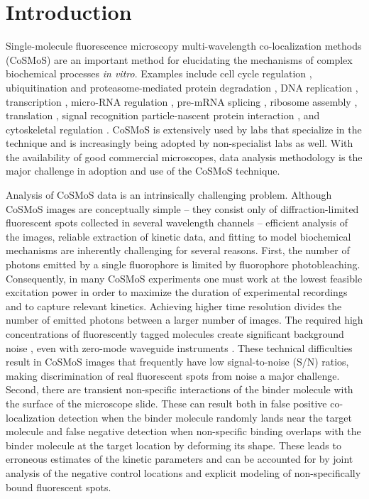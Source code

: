 \section{Introduction}

Single-molecule fluorescence microscopy multi-wavelength co-localization methods (CoSMoS) are an important method for elucidating the mechanisms of complex biochemical processes \textit{in vitro}. Examples include cell cycle regulation \citep{Lu2015-eu}, ubiquitination and proteasome-mediated protein degradation \citep{Lu2015-jq}, DNA replication \citep{Geertsema2014-bt,Ticau2015-ib}, transcription \citep{Zhang2012-no,Friedman2012-if,Friedman2013-sf}, micro-RNA regulation \citep{Salomon2015-kq}, pre-mRNA splicing \citep{Shcherbakova2013-bi, Krishnan2013-fy, Warnasooriya2014-ls}, ribosome assembly \citep{Kim2014-zc}, translation \citep{Wang2015-tt,Tsai2014-mi,OLeary2013-wo}, signal recognition particle-nascent protein interaction \citep{Noriega2014-vj}, and cytoskeletal regulation \citep{Smith2013-qj,Breitsprecher2012-mj}. CoSMoS is extensively used by labs that specialize in the technique and is increasingly being adopted by non-specialist labs as well. With the availability of good commercial microscopes, data analysis methodology is the major challenge in adoption and use of the CoSMoS technique.

Analysis of CoSMoS data is an intrinsically challenging problem. Although CoSMoS images are conceptually simple -- they consist only of diffraction-limited fluorescent spots collected in several wavelength channels -- efficient analysis of the images, reliable extraction of kinetic data, and fitting to model biochemical mechanisms are inherently challenging for several reasons. First, the number of photons emitted by a single fluorophore is limited by fluorophore photobleaching. Consequently, in many CoSMoS experiments one must work at the lowest feasible excitation power in order to maximize the duration of experimental recordings and to capture relevant kinetics. Achieving higher time resolution divides the number of emitted photons between a larger number of images. The required high concentrations of fluorescently tagged molecules create significant background noise \citep{Peng2018-ge, Van_Oijen2011-ig}, even with zero-mode waveguide instruments \citep{Chen2014-jd}. These technical difficulties result in CoSMoS images that frequently have low signal-to-noise (S/N) ratios, making discrimination of real fluorescent spots from noise a major challenge. Second, there are transient non-specific interactions of the binder molecule with the surface of the microscope slide. These can result both in false positive co-localization detection when the binder molecule randomly lands near the target molecule and false negative detection when non-specific binding overlaps with the binder molecule at the target location by deforming its shape. These leads to erroneous estimates of the kinetic parameters and can be accounted for by joint analysis of the negative control locations and explicit modeling of non-specifically bound fluorescent spots.

